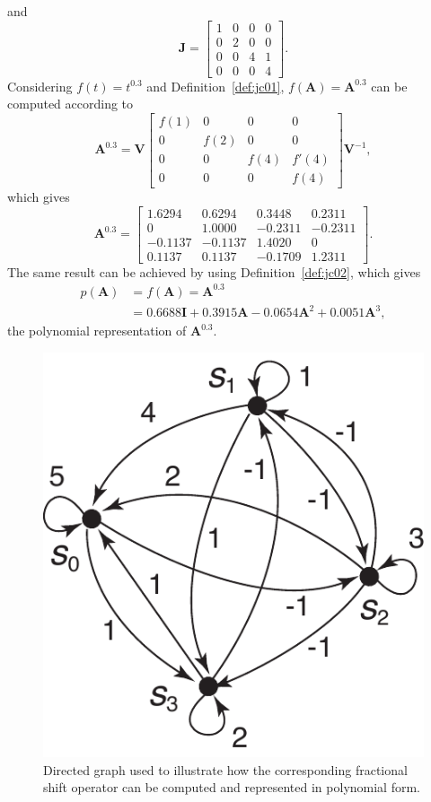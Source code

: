 and
\begin{equation}
    \mathbf{J}=\left[\begin{array}{ccccc}
            1 & 0 & 0 & 0 \\
            0 & 2 & 0 & 0 \\
            0 & 0 & 4 & 1 \\
            0 & 0 & 0 & 4
        \end{array}\right].
\end{equation}
Considering $f(t)=t^{0.3}$ and Definition~\ref{def:jc01}, $f(\mathbf{A})=\mathbf{A}^{0.3}$ can be computed according to
\begin{equation}\nonumber
    \mathbf{A}^{0.3}=\mathbf{V}
    \left[\begin{array}{ccccc}
            f(1) & 0    & 0    & 0     \\
            0    & f(2) & 0    & 0     \\
            0    & 0    & f(4) & f'(4) \\
            0    & 0    & 0    & f(4)
        \end{array}\right]\mathbf{V}^{-1},
\end{equation}
which gives
\begin{equation}\nonumber
    \mathbf{A}^{0.3}=
    \left[\begin{array}{ccccc}
            1.6294  & 0.6294  & 0.3448  & 0.2311  \\
            0       & 1.0000  & -0.2311 & -0.2311 \\
            -0.1137 & -0.1137 & 1.4020  & 0       \\
            0.1137  & 0.1137  & -0.1709 & 1.2311
        \end{array}\right].
\end{equation}
The same result can be achieved by using Definition~\ref{def:jc02}, which gives
\begin{align}
    p(\mathbf{A}) & =f(\mathbf{A})=\mathbf{A}^{0.3}\nonumber                                           \\
                  & =0.6688\mathbf{I}+0.3915\mathbf{A}-0.0654\mathbf{A}^2+0.0051\mathbf{A}^3,\nonumber
\end{align}
the polynomial representation of $\mathbf{A}^{0.3}$.

\begin{figure}
    \centering
    \includegraphics[width=0.35\linewidth]{Figures/graph_jordan.pdf}
    \caption{Directed graph used to illustrate how the corresponding fractional shift operator can be computed and represented in polynomial form.}
    \label{fig:polyrepres}
\end{figure}

